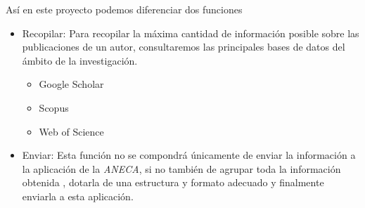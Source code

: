 Así en este proyecto podemos diferenciar dos funciones 
\begin{itemize}
	\item Recopilar: Para recopilar la máxima cantidad de información posible sobre las publicaciones de un autor, consultaremos las principales bases de datos del ámbito de la investigación.
	\begin{itemize}
		\item Google Scholar\cite{google_scholar}
		\item Scopus\cite{scopus}
		\item Web of Science\cite{wos}
	\end{itemize}
		

	\item Enviar: Esta función no se compondrá únicamente de enviar la información a la aplicación de la \emph{ANECA}, si no también de agrupar toda la información obtenida , dotarla de una estructura y formato adecuado y finalmente enviarla a esta aplicación.
	
\end{itemize}
